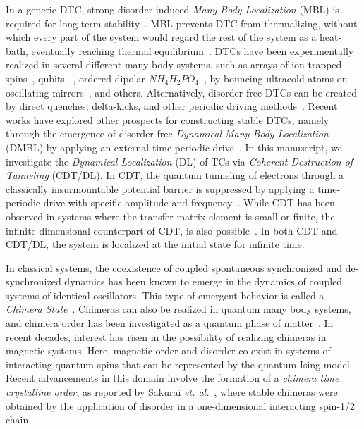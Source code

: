 \documentclass[%
nofootinbib,
reprint,
superscriptaddress,
amsmath,amssymb,showkeys,
aps,
prb,
]{revtex4-2}
\begin{document}
	In a generic DTC, strong disorder-induced \textit{Many-Body Localization} (MBL) is required for long-term stability~\cite{zhang_observation_2017}. MBL prevents DTC from thermalizing, without which every part of the system
	would regard the rest of the system as a heat-bath, eventually reaching thermal equilibrium~\cite{alet_many-body_2018,else_floquet_2016,smith_many-body_2016,nguyen_signature_2021}.  DTCs have been experimentally realized in several different many-body systems, such as arrays of ion-trapped spins~\cite{huang2018,taheri_all-optical_2022, Soham2018, zhang_observation_2017, yao_time_2018,sacha_modeling_2015}, qubits ~\cite{frey_realization_2022}, ordered dipolar $NH_4H_2PO_4$~\cite{rovny_observation_2018}, by bouncing ultracold atoms on oscillating mirrors~\cite{sacha_time_nodate,golletz_basis_2022}, and others. Alternatively, disorder-free DTCs can be created by direct quenches, delta-kicks, and other periodic driving methods~\cite{else_prethermal_2017, russomanno_spin_2017, ho_critical_2017, yu2019, russomanno_floquet_2017}.  Recent works have explored other prospects for constructing stable DTCs, namely through the emergence of disorder-free \textit{Dynamical Many-Body Localization} (DMBL)  by applying an external time-periodic drive~\cite{Keser2016, haldar_dynamical_2017, haldar_dynamical_2021,bhattacharyya_transverse_2012,aditya2023dynamical,dutta2014,das_exotic_2010}. In this manuscript, we investigate the \textit{Dynamical Localization} (DL) of TCs via \textit{Coherent Destruction of Tunneling} (CDT/DL). In CDT, the quantum tunneling of electrons through a classically insurmountable potential barrier is suppressed by applying a time-periodic drive with specific amplitude and frequency~\cite{Grossmann1991, Ashhab2007}. While CDT has been observed in systems where the transfer matrix element is small or finite,  the infinite dimensional counterpart of CDT, is also possible~\cite{das_exotic_2010, Roy2015}. In both CDT and CDT/DL, the system is localized at the initial state for infinite time\cite{Kayanuma2008}.
	
	In classical systems, the coexistence of coupled spontaneous synchronized and de-synchronized  dynamics has been known to emerge in the dynamics of coupled systems of identical oscillators. This type of emergent behavior is called a \textit{Chimera State}~\cite{kuramoto_coexistence_2002, panaggio_chimera_2015, parastesh_chimeras_2021}. Chimeras can also be realized in quantum many body systems, and chimera order has been investigated as a quantum phase of matter~\cite{bastidas_quantum_2015}. In recent decades, interest has risen in the possibility of realizing chimeras in magnetic systems. Here, magnetic order and disorder co-exist in systems of interacting quantum spins that can be represented by the quantum Ising model~\cite{singh_chimera_2011}.  Recent advancements in this domain involve the formation of a \textit{chimera time crystalline order}, as reported by Sakurai \textit{et. al.}~\cite{sakurai_phys_nodate}, where stable chimeras were obtained by the application of disorder in a one-dimensional interacting spin-1/2 chain.
	
\end{document}
